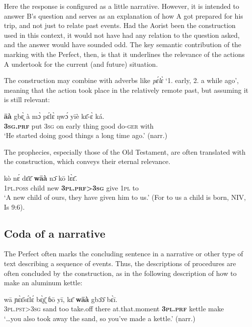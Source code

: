 \documentclass[output=paper,newtxmath,modfonts,nonflat,hidelinks]{langsci/langscibook}
\begin{document}
Here the response is configured as a little narrative. However, it is intended to answer B's question and serves as an explanation of how A got prepared for his trip, and not just to relate past events. Had the Aorist been the construction used in this context, it would not have had any relation to the question asked, and the answer would have sounded odd. The key semantic contribution of the marking with the Perfect, then, is that it underlines the relevance of the actions A undertook for the current (and future) situation.


The  construction may combine with adverbs like \textit{pɛ́lɛ̀} ‘1. early, 2. a while ago’, meaning that the action took place in the relatively remote past, but assuming it is still relevant:

\begin{exe} \ex
\gll 	\textbf{āà}	gbɛ̰̀	à	mɔ̀	pɛ́lɛ̀	ŋwɔ́	yīè	kɛ̄-ɛ̀	ká.\\
	\textbf{3\textsc{sg}.\textsc{prf}}	put	3\textsc{sg}	on	early	thing	good	do-\textsc{ger}	with\\
\glt ‘He started doing good things a long time ago.’ (narr.)
\end{exe}


The prophecies, especially those of the Old Testament, are often translated with the  construction, which conveys their eternal relevance. 

\begin{exe} \ex
\gll 	kò	nɛ́	dɛ̄ɛ̄	\textbf{wāà}	nɔ̄	kō	lɛ̀ɛ̄.\\
	1\textsc{pl}.\textsc{poss}	child	new	\textbf{3\textsc{pl}.\textsc{prf}>3\textsc{sg}}	give	1\textsc{pl}	to	\\
\glt ‘A new child of ours, they have given him to us.’ (For to us a child is born, NIV, Is 9:6).
\end{exe}

\subsection{Coda of a narrative}
\label{khachcodanarr}
The Perfect often marks the concluding sentence in a narrative or other type of text describing a sequence of events. Thus, the descriptions of procedures are often concluded by the  construction, as in the following description of how to make an aluminum kettle:

\begin{exe}\ex
\gll {\ldots}wā	ɲɛ̀ɛ̄sɛ́lɛ́	bɛ̰̀ɛ̰̄	ɓō	yī,	kɛ̄	\textbf{wāà}	gbɔ̄ɔ̄	bɛ̀ī.\\
3\textsc{pl}.\textsc{pst}>3\textsc{sg}	sand	too	take.off	there at.that.moment	\textbf{3\textsc{pl}.\textsc{prf}} kettle	make\\
\glt ‘{\ldots}you also took away the sand, so you’ve made a kettle.’ (narr.)
\end{exe}
\end{document}
